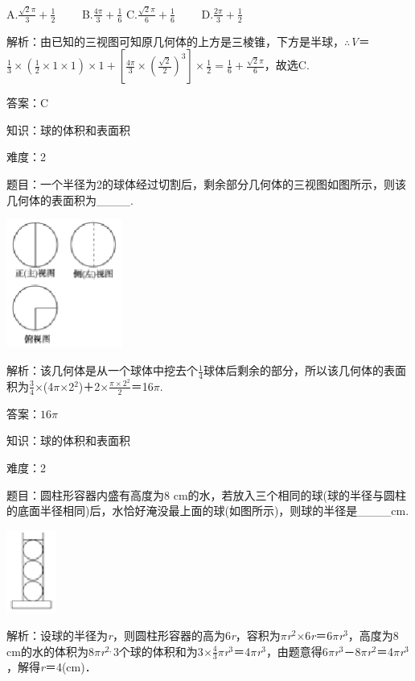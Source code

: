\documentclass{article} %
\begin{document}
A.$\frac{\sqrt{2}\pi}{3}
+\frac{1}{2}$　　 B.$\frac{4\pi}{3}
+\frac{1}{6}$ C.$\frac{\sqrt{2}\pi}{6}
+\frac{1}{6}$　　 D.$\frac{2\pi}{3}
+\frac{1}{2}$

解析：由已知的三视图可知原几何体的上方是三棱锥，下方是半球，$\mathrm{\therefore}$\textit{V}＝$\frac{1}{3}\times(\frac{1}{2}\times 1\times 1)\times 1+[\frac{4\pi}{3}\times(\frac{\sqrt{2}}{2})^3]\times\frac{1}{2}=\frac{1}{6}+\frac{\sqrt{2}\pi}{6}$，故选C.

答案：C

知识：球的体积和表面积

难度：2

题目：一个半径为2的球体经过切割后，剩余部分几何体的三视图如图所示，则该几何体的表面积为\_\_\_\_.

\includegraphics*[width=1.50in, height=1.66in, keepaspectratio=false]{image81}

解析：该几何体是从一个球体中挖去个$\frac{1}{4}$球体后剩余的部分，所以该几何体的表面积为$\frac{3}{4}\mathrm{\times}$(4$\pi$$\mathrm{\times}$2${}^{2}$)＋2$\mathrm{\times}\frac{\pi\times 2^2}{2}$＝16$\pi$.

答案：$16\pi$

知识：球的体积和表面积

难度：2

题目：圆柱形容器内盛有高度为8 cm的水，若放入三个相同的球(球的半径与圆柱的底面半径相同)后，水恰好淹没最上面的球(如图所示)，则球的半径是\_\_\_\_cm.

\includegraphics*[width=0.65in, height=1.07in, keepaspectratio=false]{image82}

解析：设球的半径为\textit{r}，则圆柱形容器的高为6\textit{r}，容积为$\pi$\textit{r}${}^{2}$$\mathrm{\times}$6\textit{r}＝6$\pi$\textit{r}${}^{3}$，高度为8 cm的水的体积为8$\pi$\textit{r}${}^{2,}$3个球的体积和为3$\mathrm{\times}\frac{4}{3}$$\pi$\textit{r}${}^{3}$＝4$\pi$\textit{r}${}^{3}$，由题意得6$\pi$\textit{r}${}^{3}$－8$\pi$\textit{r}${}^{2}$＝4$\pi$\textit{r}${}^{3}$，解得\textit{r}＝4(cm)．
\end{document}
